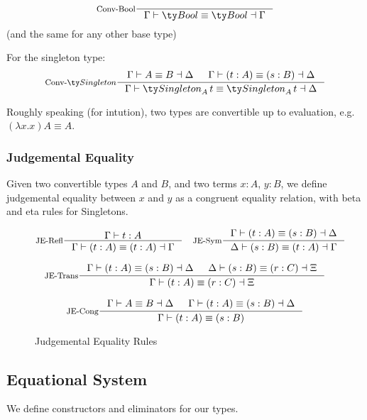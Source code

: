 \[
\inference[Conv-Bool]{}{\Gamma \vdash \Bool \equiv \Bool \dashv \Gamma}
\]
(and the same for any other base type)

For the singleton type:
\[
\inference[Conv-$\Singleton$]
    { \Gamma \vdash A \equiv B \dashv \Delta
    & \Gamma \vdash (t : A) \equiv (s : B) \dashv \Delta
    }
    { \Gamma \vdash \Singleton[A][t] \equiv \Singleton[A][t] \dashv \Delta }
\]

Roughly speaking (for intution), two types are convertible up to evaluation, e.g. $(\lambda x. x) A \equiv A$.

\subsubsection{Judgemental Equality}
Given two convertible types $A$ and $B$, and two terms $x : A$, $y : B$, we define judgemental equality between $x$ and $y$ as a congruent equality relation, with beta and eta rules for Singletons.

\begin{figure*}[h]
  \[
    \inference[JE-Refl]{\Gamma \vdash t : A}
                    {\Gamma \vdash (t : A) \equiv (t : A) \dashv \Gamma}
    \quad
    \inference[JE-Sym]{\Gamma \vdash (t : A) \equiv (s : B) \dashv \Delta}
                     {\Delta \vdash (s : B) \equiv (t : A) \dashv \Gamma}
  \]

  \[
    \inference[JE-Trans]{\Gamma \vdash (t : A) \equiv (s : B) \dashv \Delta & \Delta \vdash (s : B) \equiv (r : C) \dashv \Xi}
                     {\Gamma \vdash (t : A) \equiv (r : C) \dashv \Xi}
  \]

  \[
    \inference[JE-Cong]{\Gamma \vdash A \equiv B \dashv \Delta & \Gamma \vdash (t : A) \equiv (s : B) \dashv \Delta}
                     {\Gamma \vdash (t : A) \equiv (s : B)}
  \]

  \caption*{Judgemental Equality Rules}
  \label{fig:base-dt-je-rules}
\end{figure*}


\subsection{Equational System}
We define constructors and eliminators for our types.

